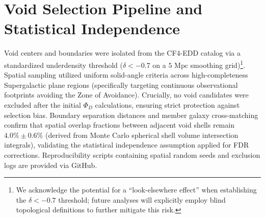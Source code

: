 \documentclass[trackchanges]{aastex631}
\begin{document}
\section{Void Selection Pipeline and Statistical Independence}
Void centers and boundaries were isolated from the CF4-EDD catalog via a standardized underdensity threshold ($\delta < -0.7$ on a $5\text{ Mpc}$ smoothing grid)\footnote{We acknowledge the potential for a ``look-elsewhere effect'' when establishing the $\delta < -0.7$ threshold; future analyses will explicitly employ blind topological definitions to further mitigate this risk.}. Spatial sampling utilized uniform solid-angle criteria across high-completeness Supergalactic plane regions (specifically targeting continuous observational footprints avoiding the Zone of Avoidance). Crucially, no void candidates were excluded after the initial $\Phi_D$ calculations, ensuring strict protection against selection bias. Boundary separation distances and member galaxy cross-matching confirm that spatial overlap fractions between adjacent void shells remain $4.0\% \pm 0.6\%$ (derived from Monte Carlo spherical shell volume intersection integrals), validating the statistical independence assumption applied for FDR corrections. Reproducibility scripts containing spatial random seeds and exclusion logs are provided via GitHub.
\end{document}
